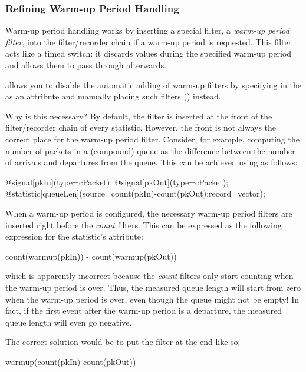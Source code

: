 \subsubsection{Refining Warm-up Period Handling}
\label{sec:ana-sim:refining-warmup-period-handling}

Warm-up period handling works by inserting a special filter, a \textit{warm-up
period filter}, into the filter/recorder chain if a warm-up period is requested.
This filter acts like a timed switch: it discards values during the specified
warm-up period and allows them to pass through afterwards.

{\opp} allows you to disable the automatic adding of warm-up filters by
specifying  in the  as an attribute
and manually placing such filters () instead.

Why is this necessary? By default, the filter is inserted at the front of the
filter/recorder chain of every statistic. However, the front is not always the
correct place for the warm-up period filter. Consider, for example, computing
the number of packets in a (compound) queue as the difference between the number
of arrivals and departures from the queue. This can be achieved using
 as follows:

\begin{ned}
@signal[pkIn](type=cPacket);
@signal[pkOut](type=cPacket);
@statistic[queueLen](source=count(pkIn)-count(pkOut);record=vector);
\end{ned}

When a warm-up period is configured, the necessary warm-up period filters are
inserted right before the \textit{count} filters. This can be expressed as the
following expression for the statistic's  attribute:

\begin{ned}
count(warmup(pkIn)) - count(warmup(pkOut))
\end{ned}

which is apparently incorrect because the \textit{count} filters only start
counting when the warm-up period is over. Thus, the measured queue length will
start from zero when the warm-up period is over, even though the queue might not
be empty! In fact, if the first event after the warm-up period is a departure,
the measured queue length will even go negative.

The correct solution would be to put the  filter at the end like so:

\begin{ned}
warmup(count(pkIn)-count(pkOut))
\end{ned}

